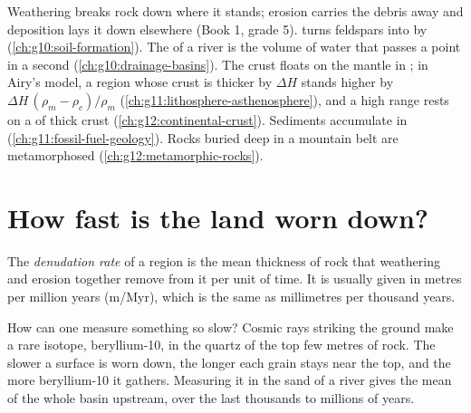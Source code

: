 \begin{recall}
Weathering breaks rock down where it stands; erosion carries the debris away
and deposition lays it down elsewhere (Book 1, grade 5). 
turns feldspars into  by 
(\cref{ch:g10:soil-formation}). The  of a river is the volume of
water that passes a point in a second (\cref{ch:g10:drainage-basins}). The
crust floats on the mantle in ; in Airy's model, a region whose crust
is thicker by $\Delta H$ stands higher by $\Delta H\,(\rho_m - \rho_c)/\rho_m$
(\cref{ch:g11:lithosphere-asthenosphere}), and a high range rests on a 
of thick crust (\cref{ch:g12:continental-crust}). Sediments accumulate in
 (\cref{ch:g11:fossil-fuel-geology}). Rocks buried deep in
a mountain belt are metamorphosed (\cref{ch:g12:metamorphic-rocks}).
\end{recall}

\section{How fast is the land worn down?}

\begin{definition}\label{def:g12:destruction-of-mountains:denudation}
The \emph{denudation rate} of a region is the mean
thickness of rock that weathering and erosion together remove from it per
unit of time. It is usually given in metres per million years
(\unit{m/Myr}), which is the same as millimetres per thousand years.
\end{definition}

How can one measure something so slow? Cosmic rays striking the ground make
a rare isotope, beryllium-10, in the quartz of the top few metres of rock.
The slower a surface is worn down, the longer each grain stays near the top,
and the more beryllium-10 it gathers. Measuring it in the sand of a river
gives the mean  of the whole basin upstream, over the last
thousands to millions of years.

